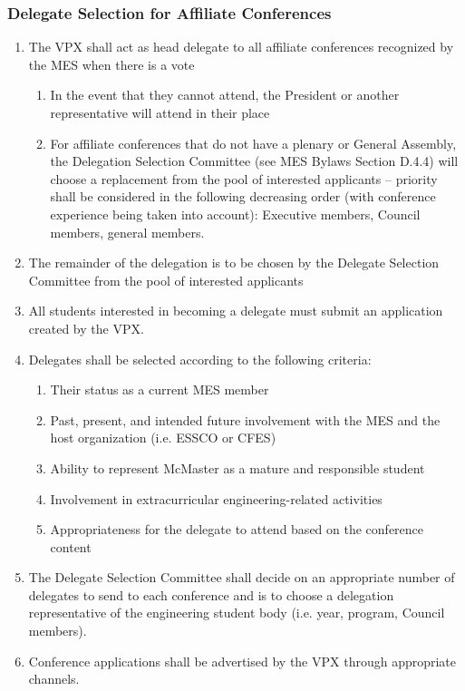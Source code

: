 \hypertarget{delegate-selection-for-affiliate-conferences}{%
 \subsubsection{Delegate Selection for Affiliate
  Conferences}
 \label{delegate-selection-for-affiliate-conferences}}
\begin{enumerate}
 \item
  The VPX shall act as head delegate to all affiliate conferences
  recognized by the MES when there is a vote

  \begin{enumerate}
   \item
    In the event that they cannot attend, the President or another
    representative will attend in their place
   \item
    For affiliate conferences that do not have a plenary or General
    Assembly, the Delegation Selection Committee (see MES Bylaws Section
    D.4.4) will choose a replacement from the pool of interested
    applicants -- priority shall be considered in the following
    decreasing order (with conference experience being taken into
    account): Executive members, Council members, general members.
  \end{enumerate}
 \item
  The remainder of the delegation is to be chosen by the Delegate
  Selection Committee from the pool of interested applicants
 \item
  All students interested in becoming a delegate must submit an
  application created by the VPX.
 \item
  Delegates shall be selected according to the following criteria:

  \begin{enumerate}
   \item
    Their status as a current MES member
   \item
    Past, present, and intended future involvement with the MES and the
    host organization (i.e. ESSCO or CFES)
   \item
    Ability to represent McMaster as a mature and responsible student
   \item
    Involvement in extracurricular engineering-related activities
   \item
    Appropriateness for the delegate to attend based on the conference
    content
  \end{enumerate}
 \item
  The Delegate Selection Committee shall decide on an appropriate number
  of delegates to send to each conference and is to choose a delegation
  representative of the engineering student body (i.e. year, program,
  Council members).
 \item
  Conference applications shall be advertised by the VPX through
  appropriate channels.

\end{enumerate}

